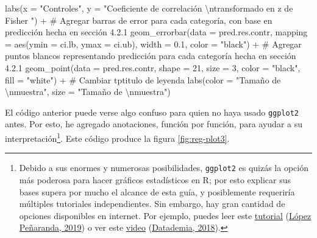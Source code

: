 \documentclass[
  bookmarksnumbered]{article}
\newenvironment{Shaded}{\begin{snugshade}}{\end{snugshade}}
\newcommand{\AttributeTok}[1]{\textcolor[rgb]{0.00,0.34,0.68}{#1}}
\newcommand{\CommentTok}[1]{\textcolor[rgb]{0.54,0.53,0.53}{#1}}
\newcommand{\DecValTok}[1]{\textcolor[rgb]{0.69,0.50,0.00}{#1}}
\newcommand{\FloatTok}[1]{\textcolor[rgb]{0.69,0.50,0.00}{#1}}
\newcommand{\FunctionTok}[1]{\textcolor[rgb]{0.39,0.29,0.61}{#1}}
\newcommand{\NormalTok}[1]{\textcolor[rgb]{0.12,0.11,0.11}{#1}}
\newcommand{\SpecialCharTok}[1]{\textcolor[rgb]{0.24,0.68,0.91}{#1}}
\newcommand{\StringTok}[1]{\textcolor[rgb]{0.75,0.01,0.01}{#1}}
\begin{document}
\begin{Shaded}
\begin{Highlighting}[]
  \FunctionTok{labs}\NormalTok{(}\AttributeTok{x =} \StringTok{"Controles"}\NormalTok{, }
       \AttributeTok{y =} \StringTok{"Coeficiente de correlación }\SpecialCharTok{\textbackslash{}n}\StringTok{transformado en z de Fisher "}\NormalTok{) }\SpecialCharTok{+}
  \CommentTok{\# Agregar barras de error para cada categoría, con base en predicción hecha en sección 4.2.1}
  \FunctionTok{geom\_errorbar}\NormalTok{(}\AttributeTok{data =}\NormalTok{ pred.res.contr,}
                \AttributeTok{mapping =} \FunctionTok{aes}\NormalTok{(}\AttributeTok{ymin =}\NormalTok{ ci.lb, }\AttributeTok{ymax =}\NormalTok{ ci.ub),}
                \AttributeTok{width =} \FloatTok{0.1}\NormalTok{,}
                \AttributeTok{color =} \StringTok{"black"}\NormalTok{) }\SpecialCharTok{+}
  \CommentTok{\# Agregar puntos blancos representando predicción para cada categoría hecha en sección 4.2.1}
  \FunctionTok{geom\_point}\NormalTok{(}\AttributeTok{data =}\NormalTok{ pred.res.contr,}
             \AttributeTok{shape =} \DecValTok{21}\NormalTok{, }\AttributeTok{size =} \DecValTok{3}\NormalTok{,}
             \AttributeTok{color =} \StringTok{"black"}\NormalTok{, }\AttributeTok{fill =} \StringTok{"white"}\NormalTok{) }\SpecialCharTok{+}
  \CommentTok{\# Cambiar tptitulo de leyenda}
  \FunctionTok{labs}\NormalTok{(}\AttributeTok{color =} \StringTok{"Tamaño de }\SpecialCharTok{\textbackslash{}n}\StringTok{muestra"}\NormalTok{,}
       \AttributeTok{size =} \StringTok{"Tamaño de }\SpecialCharTok{\textbackslash{}n}\StringTok{muestra"}\NormalTok{)}
\end{Highlighting}
\end{Shaded}

El código anterior puede verse algo confuso para quien no haya usado \texttt{ggplot2} antes. Por esto, he agregado anotaciones, función por función, para ayudar a su interpretación\footnote{Debido a sus enormes y numerosas posibilidades, \texttt{ggplot2} es quizás la opción más poderosa para hacer gráficos estadísticos en R; por esto explicar sus bases supera por mucho el alcance de esta guía, y posiblemente requeriría múltiples tutoriales independientes. Sin embargo, hay gran cantidad de opciones disponibles en internet. Por ejemplo, puedes leer este \href{https://rpubs.com/anlope10/562981}{tutorial} (\protect\hyperlink{ref-lopezpenarandaTutorialGgplot22019}{López Peñaranda, 2019}) o ver este \href{https://youtu.be/BUzTAr_QqKs}{video} (\protect\hyperlink{ref-datademiaAprendeGgplot22018}{Datademia, 2018}).}. Este código produce la figura \ref{fig:reg-plot3}.
\end{document}
